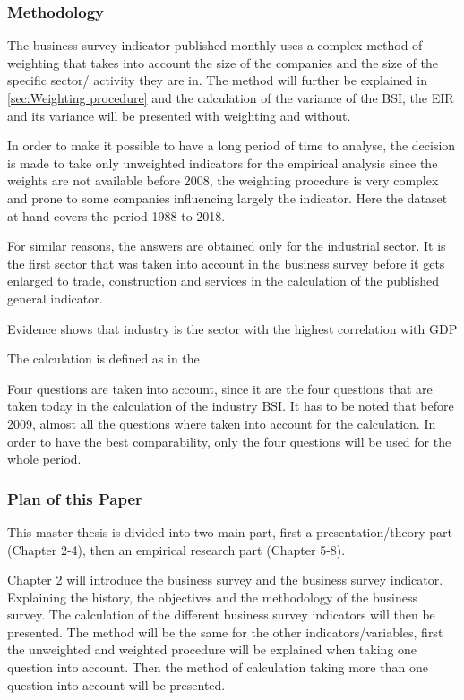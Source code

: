 \documentclass[12pt,a4paper,oneside]{book}
\begin{document}
\subsubsection{Methodology}

The business survey indicator published monthly uses a complex method of weighting that takes into account the size of the companies and the size of the specific sector/ activity they are in. The method will further be explained in \autoref{sec:Weighting procedure} and the calculation of the variance of the BSI, the EIR and its variance will be presented with weighting and without.

In order to make it possible to have a long period of time to analyse, the decision is made to take only unweighted indicators for the empirical analysis since the weights are not available before 2008, the weighting procedure is very complex and prone to some companies influencing largely the indicator. 
Here the dataset at hand covers the period 1988 to 2018.

For similar reasons, the answers are obtained only for the industrial sector.
It is the first sector that was taken into account in the business survey before it gets enlarged to trade, construction and services in the calculation of the published general indicator.

Evidence shows that industry is the sector with the highest correlation with GDP 


The calculation is defined as in the

Four questions are taken into account, since it are the four questions that are taken today in the calculation of the industry BSI. 
It has to be noted that before 2009, almost all the questions where taken into account for the calculation. In order to have the best comparability, only the four questions will be used for the whole period.

\subsubsection{Plan of this Paper}

This master thesis is divided into two main part, first a presentation/theory part (Chapter 2-4), then an empirical research part (Chapter 5-8).

Chapter 2 will introduce the business survey and the business survey indicator. Explaining the history, the objectives and the methodology of the business survey. The calculation of the different business survey indicators will then be presented. The method will be the same for the other indicators/variables, first the unweighted and weighted procedure will be explained when taking one question into account. Then the method of calculation taking more than one question into account will be presented.
\end{document}
